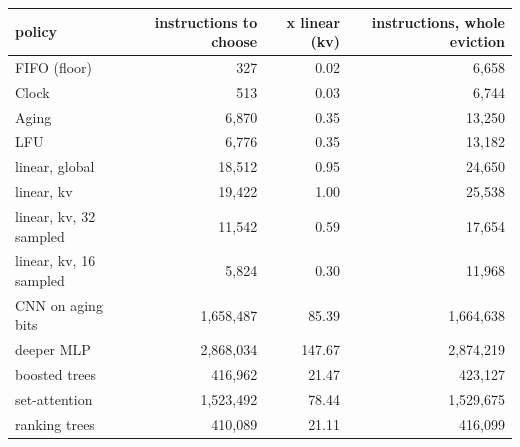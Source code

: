 \begin{tabular}{lrrr}
\toprule
policy & instructions to choose & x linear (kv) & instructions, whole eviction \\
\midrule
FIFO (floor) & 327 & 0.02 & 6,658 \\
Clock & 513 & 0.03 & 6,744 \\
Aging & 6,870 & 0.35 & 13,250 \\
LFU & 6,776 & 0.35 & 13,182 \\
linear, global & 18,512 & 0.95 & 24,650 \\
linear, kv & 19,422 & 1.00 & 25,538 \\
linear, kv, 32 sampled & 11,542 & 0.59 & 17,654 \\
linear, kv, 16 sampled & 5,824 & 0.30 & 11,968 \\
CNN on aging bits & 1,658,487 & 85.39 & 1,664,638 \\
deeper MLP & 2,868,034 & 147.67 & 2,874,219 \\
boosted trees & 416,962 & 21.47 & 423,127 \\
set-attention & 1,523,492 & 78.44 & 1,529,675 \\
ranking trees & 410,089 & 21.11 & 416,099 \\
\bottomrule
\end{tabular}
